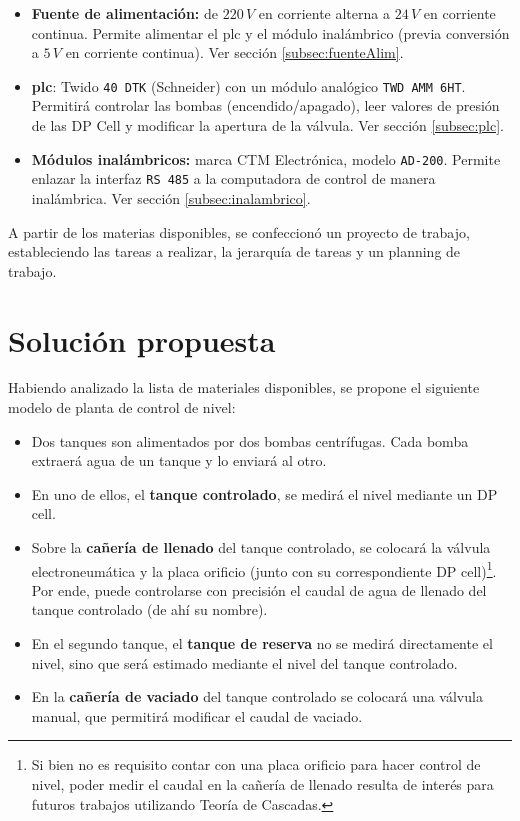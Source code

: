 \begin{itemize}
  \item \textbf{Fuente de alimentación:}
  de $220\,V$ en corriente alterna a $24\,V$ en corriente continua.
  Permite alimentar el \gls{plc} y el módulo inalámbrico (previa conversión a
  $5\,V$ en corriente continua).
  Ver sección \ref{subsec:fuenteAlim}.

  \item{\textbf{\gls{plc}}}: Twido \verb|40 DTK| (Schneider) con un módulo
  analógico \verb|TWD AMM 6HT|.
  Permitirá controlar las bombas (encendido/apagado), 
  leer valores de presión de las DP Cell y modificar la apertura de la 
  válvula. Ver sección \ref{subsec:plc}.

  \item \textbf{Módulos inalámbricos:} marca CTM Electrónica,
  modelo \verb|AD-200|.
  Permite enlazar la interfaz \verb|RS 485| a la computadora de control
  de manera inalámbrica. Ver sección \ref{subsec:inalambrico}.
\end{itemize}

A partir de los materias disponibles, se confeccionó
un proyecto de trabajo, estableciendo las tareas a realizar, la jerarquía de
tareas y un planning de trabajo.

\section{Solución propuesta}
\label{sec:SolucionPropuesta}

Habiendo analizado la lista de materiales disponibles, se propone el siguiente
modelo de planta de control de nivel:
\begin{itemize}
 \item Dos tanques son alimentados por dos bombas centrífugas.
 Cada bomba extraerá agua de un tanque y lo enviará al otro.
 \item En uno de ellos, el \textbf{tanque controlado}, se medirá el nivel
 mediante un DP cell.
 \item Sobre la \textbf{cañería de llenado} del tanque controlado, se
 colocará la válvula electroneumática y la placa orificio (junto
con su correspondiente DP cell)\footnote{Si bien no es  requisito contar con
una placa orificio para hacer  control de nivel,  poder medir el caudal en la
cañería de llenado resulta  de  interés para  futuros trabajos  utilizando
Teoría de Cascadas.}.
 Por ende, puede controlarse con precisión el caudal de agua de llenado del
 tanque controlado (de ahí su nombre).
 \item En el segundo tanque, el \textbf{tanque de reserva} no se medirá
 directamente el  nivel, sino que será estimado mediante el nivel del tanque
 controlado.
 \item En la \textbf{cañería de vaciado} del tanque controlado se colocará una
válvula manual, que permitirá modificar el caudal de vaciado.
\end{itemize}


